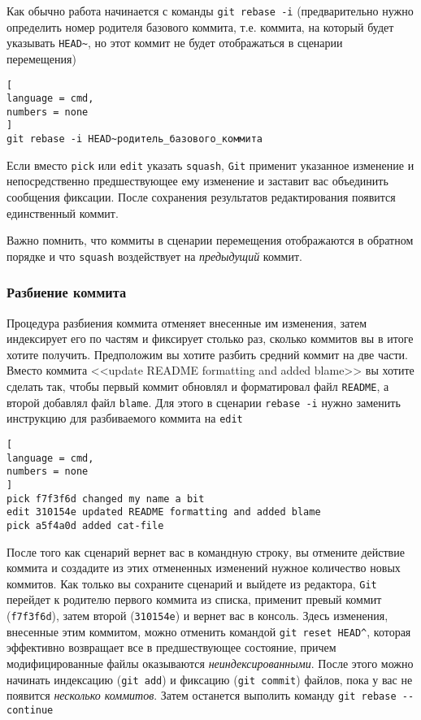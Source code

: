 \documentclass[%
	11pt,
	a4paper,
	utf8,
		]{article}
\begin{document}
Как обычно работа начинается с команды \texttt{git rebase -i} (предварительно нужно определить номер родителя базового коммита, т.е. коммита, на который будет указывать \texttt{HEAD\~}, но этот коммит не будет отображаться в сценарии перемещения)
\begin{lstlisting}[
language = cmd,
numbers = none
]
git rebase -i HEAD~родитель_базового_коммита
\end{lstlisting}

Если вместо \texttt{pick} или \texttt{edit} указать \texttt{squash}, \texttt{Git} применит указанное изменение и непосредственно предшествующее ему изменение и заставит вас объединить сообщения фиксации. После сохранения результатов редактирования появится единственный коммит.

Важно помнить, что коммиты в сценарии перемещения отображаются в обратном порядке и что \texttt{squash} воздействует на \emph{предыдущий} коммит.

\subsubsection{Разбиение коммита}

Процедура разбиения коммита отменяет внесенные им изменения, затем индексирует его по частям и фиксирует столько раз, сколько коммитов вы в итоге хотите получить. Предположим вы хотите разбить средний коммит на две части. Вместо коммита <<update README formatting and added blame>> вы хотите сделать так, чтобы первый коммит обновлял и форматировал файл \texttt{README}, а второй добавлял файл \texttt{blame}. Для этого в сценарии \texttt{rebase -i} нужно заменить инструкцию для разбиваемого коммита на \texttt{edit}

\begin{lstlisting}[
language = cmd,
numbers = none
]
pick f7f3f6d changed my name a bit
edit 310154e updated README formatting and added blame
pick a5f4a0d added cat-file 
\end{lstlisting}

После того как сценарий вернет вас в командную строку, вы отмените действие коммита и создадите из этих отмененных изменений нужное количество новых коммитов. Как только вы сохраните сценарий и выйдете из редактора, \texttt{Git} перейдет к родителю первого коммита из списка, применит превый коммит (\texttt{f7f3f6d}), затем второй (\texttt{310154e})  и вернет вас в консоль. Здесь изменения, внесенные этим коммитом, можно отменить командой \lstinline{git reset HEAD^}, которая эффективно возвращает все в предшествующее состояние, причем модифицированные файлы оказываются \emph{неиндексированными}. После этого можно начинать индексацию (\texttt{git add}) и фиксацию (\texttt{git commit}) файлов, пока у вас не появится \emph{несколько коммитов}. Затем останется выполить команду \verb|git rebase --continue|
\end{document}

